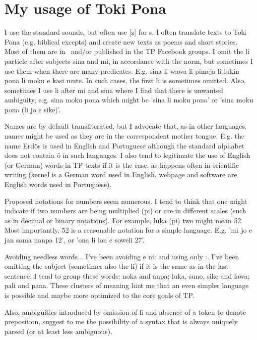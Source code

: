 \appendix
\section{My usage of Toki Pona}\label{mytoki}
I use the standard sounds, but often use [z] for s.
I often translate texts to Toki Pona (e.g. biblical excepts)
and create new texts as poems and short stories.
Most of them are in~\cite{tokisona}
and/or published in the TP Facebook groups.
I omit the li particle after subjects sina and mi,
in accordance with the norm,
but sometimes I use them when there are many predicates.
E.g. sina li wawa li pimeja li lukin pona li moku e kasi mute.
In such cases, the first li is sometimes omitted.
Also, sometimes I use li after mi and sina where I find
that there is unwanted ambiguity, e.g.
sina moku pona 
which 
might be 'sina li moku pona' or 'sina moku pona (li jo e sike)'.

Names are by default transliterated,
but I advocate that, as in other languages,
names might be used as they are in the
correspondent mother tongue.
E.g. the name Erdös is used in
English and Portuguese although the standard
alphabet does not contain ö in such languages.
I also tend to legitimate the use of English (or German) words
in TP texts if it is the case,
as happens often in scientific writing
(kernel is a German word used in English,
webpage and software are English words used in Portuguese).

Proposed notations for numbers seem numerous.
I tend to think that one might indicate if two numbers
are being multiplied (pi) or are in different scales
(such as in decimal or binary notations).
For example, luka (pi) two might mean 52.
Most importantly,
52 is a reasonable notation for a simple language.
E.g.
'mi jo e jan sama nanpa 12',
or
'ona li lon e soweli 27'.

Avoiding needless words...
I've been avoiding e ni: and using only :.
I've been omitting the subject (sometimes also the li)
if it is the
same as in the last sentence.
I tend to group these words:
noka and anpa; luka, suno, sike and lawa; pali and pana.
These clusters of meaning hint me that an even simpler
language is possible and maybe more optimized to the
core goals of TP.

Also, ambiguities introduced by omission of li
and absence of a token to denote preposition,
suggest to me the possibility of a syntax that is always uniquely
parsed (or at least less ambiguous).

